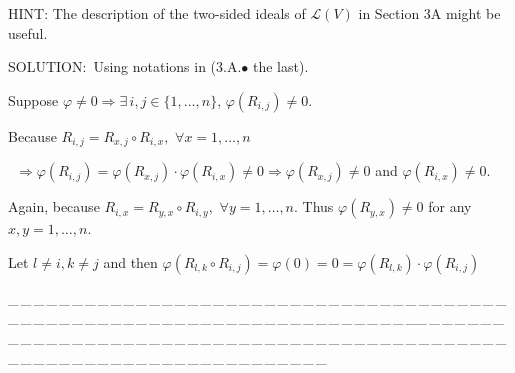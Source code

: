 \documentclass[a4paper, 11pt, UTF8]{article}
\def\Lm{\mathcal{L}}
\begin{document}
\begin{large}
{H{\small INT:}} {\timessl\large The description of the two-sided ideals of $\Lm(V)$ in Section 3A might be useful.}\par
{\timesbf S\footnotesize{OLUTION:}}\Large\,\,\,Using notations in (3.A.$\bullet$ the last).\par\quad
Suppose $\varphi\neq 0\Rightarrow\exists\,i,j\in\{1,\dots,n\},\,\varphi(R_{i,j})\neq 0$.\par\quad
Because $R_{i,j}=R_{x,j}\circ R_{i,x},\,\,\forall x=1,\dots,n$\par\qquad\,
$\Rightarrow\varphi(R_{i,j})=\varphi(R_{x,j})\cdot\varphi(R_{i,x})\neq 0\Rightarrow\varphi(R_{x,j})\neq 0$ and $\varphi(R_{i,x})\neq 0.$\par\quad
Again, because $R_{i,x}=R_{y,x}\circ R_{i,y},\,\,\forall y=1,\dots,n.$ Thus $\varphi(R_{y,x})\neq 0$ for any $x,y=1,\dots,n.$\par\quad
Let $l\neq i,k\neq j$ and then $\varphi(R_{l,k}\circ R_{i,j})=\varphi(0)=0=\varphi(R_{l,k})\cdot\varphi(R_{i,j})$\par
{}\large
{\tiny \_\,\_\,\_\,\_\,\_\,\_\,\_\,\_\,\_\,\_\,\_\,\_\,\_\,\_\,\_\,\_\,\_\,\_\,\_\,\_\,\_\,\_\,\_\,\_\,\_\,\_\,\_\,\_\,\_\,\_\,\_\,\_\,\_\,\_\,\_\,\_\,\_\,\_\,\_\,\_\,\_\,\_\,\_\,\_\,\_\,\_\,\_\,\_\,\_\,\_\,\_\,\_\,\_\,\_\,\_\,\_\,\_\,\_\,\_\,\_\,\_\,\_\,\_\,\_\,\_\,\_\,\_\,\_\,\_\,\_\,\_\_\,\_\,\_\,\_\,\_\,\_\,\_\,\_\,\_\,\_\,\_\,\_\,\_\,\_\,\_\,\_\,\_\,\_\,\_\,\_\,\_\,\_\,\_\,\_\,\_\,\_\,\_\,\_\,\_\,\_\,\_\,\_\,\_\,\_\,\_\,\_\,\_\,\_\,\_\,\_\,\_\,\_\,\_\,\_\,\_\,\_\,\_\,\_\,\_\,\_\,\_\,\_\,\_\,\_\,\_\,\_\,\_\,\_\,\_\,\_\,\_\,\_\,\_\,\_\,\_\,\_\,\_\,\_\,\_\,\_\,\_}\par


\end{large}
\end{document}
